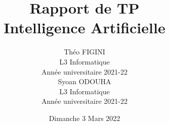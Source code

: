 \documentclass[12pt]{report}
\title{{\huge \bfseries Rapport de TP}\\[0.2cm]
		{\Large Intelligence Artificielle}}
\author{Théo \textsc{FIGINI}\\L3 Informatique\\Année universitaire 2021-22\\ [1.5cm]
				Syoan \textsc{ODOUHA}\\L3 Informatique\\Année universitaire 2021-22}
\date{Dimanche 3 Mars 2022}
\begin{document}


\renewcommand{\thefigure}{\arabic{figure}}
\setcounter{figure}{0}


% 

\end{document}
